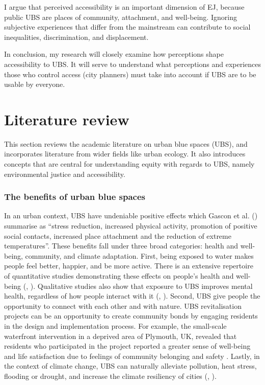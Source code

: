 \documentclass{article}
\begin{document}
I argue that perceived accessibility is an important dimension of EJ, because public UBS are places of community, attachment, and well-being. Ignoring subjective experiences that differ from the mainstream can contribute to social inequalities, discrimination, and displacement.

In conclusion, my research will closely examine how perceptions shape accessibility to UBS. It will serve to understand what perceptions and experiences those who control access (city planners) must take into account if UBS are to be usable by everyone.

\pagebreak
\section{Literature review}

This section reviews the academic literature on urban blue spaces (UBS), and incorporates literature from wider fields like urban ecology. It also introduces concepts that are central for understanding equity with regards to UBS, namely environmental justice and accessibility. 

\subsubsection{The benefits of urban blue spaces}

In an urban context, UBS have undeniable positive effects which Gascon et al. (\citeyear{gascon2017outdoor}) summarise as ``stress reduction, increased physical activity, promotion of positive social contacts, increased place attachment and the reduction of extreme temperatures''. These benefits fall under three broad categories: health and well-being, community, and climate adaptation.
First, being exposed to water makes people feel better, happier, and be more active. There is an extensive repertoire of quantitative studies demonstrating these effects on people's health and well-being (\cite{gascon2017outdoor}, \cite{britton2020blue}).
Qualitative studies also show that exposure to UBS improves mental health, regardless of how people interact with it (\cite{garrett2019urban}, \cite{van2021urban}).
Second, UBS give people the opportunity to connect with each other and with nature. UBS revitalisation projects can be an opportunity to create community bonds by engaging residents in the design and implementation process. For example, the small-scale waterfront intervention in a deprived area of Plymouth, UK, revealed that residents who participated in the project reported a greater sense of well-being and life satisfaction due to feelings of community belonging and safety \parencite{van2021urban}.
Lastly, in the context of climate change, UBS can naturally alleviate pollution, heat stress, flooding or drought, and increase the climate resiliency of cities (\cite{lin2020water}, \cite{o2021international}). 
\end{document}
